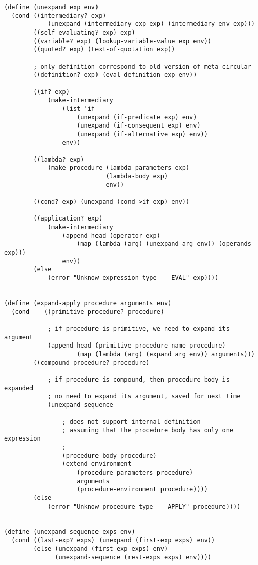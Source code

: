 \documentclass{article}
\begin{document}
\begin{CJK*}{UTF8}{gkai}
\begin{lstlisting}[basicstyle=\scriptsize\ttfamily\bfseries]
(define (unexpand exp env)
  (cond ((intermediary? exp) 
            (unexpand (intermediary-exp exp) (intermediary-env exp)))
        ((self-evaluating? exp) exp)
        ((variable? exp) (lookup-variable-value exp env))
        ((quoted? exp) (text-of-quotation exp))
        
        ; only definition correspond to old version of meta circular 
        ((definition? exp) (eval-definition exp env))

        ((if? exp)
            (make-intermediary
                (list 'if 
                    (unexpand (if-predicate exp) env)
                    (unexpand (if-consequent exp) env)
                    (unexpand (if-alternative exp) env))
                env))

        ((lambda? exp) 
            (make-procedure (lambda-parameters exp)
                            (lambda-body exp)
                            env))

        ((cond? exp) (unexpand (cond->if exp) env))

        ((application? exp)
            (make-intermediary 
                (append-head (operator exp)
                    (map (lambda (arg) (unexpand arg env)) (operands exp)))
                env))
        (else
            (error "Unknow expression type -- EVAL" exp))))


(define (expand-apply procedure arguments env)
  (cond    ((primitive-procedure? procedure)

            ; if procedure is primitive, we need to expand its argument
            (append-head (primitive-procedure-name procedure) 
                    (map (lambda (arg) (expand arg env)) arguments)))
        ((compound-procedure? procedure)

            ; if procedure is compound, then procedure body is expanded
            ; no need to expand its argument, saved for next time
            (unexpand-sequence

                ; does not support internal definition
                ; assuming that the procedure body has only one expression
                ;
                (procedure-body procedure)
                (extend-environment
                    (procedure-parameters procedure)
                    arguments
                    (procedure-environment procedure))))
        (else 
            (error "Unknow procedure type -- APPLY" procedure))))


(define (unexpand-sequence exps env)
  (cond ((last-exp? exps) (unexpand (first-exp exps) env))
        (else (unexpand (first-exp exps) env)
              (unexpand-sequence (rest-exps exps) env))))




\end{lstlisting}
\end{CJK*}
\end{document}
